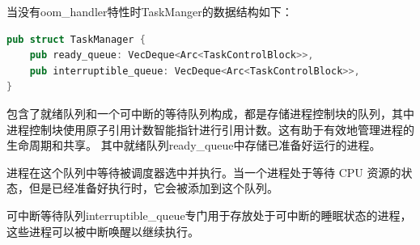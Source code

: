 当没有oom_handler特性时TaskManger的数据结构如下：
\begin{lstlisting}[language=rust,caption={数据结构TaskManager}]
    pub struct TaskManager {
    pub ready_queue: VecDeque<Arc<TaskControlBlock>>,
    pub interruptible_queue: VecDeque<Arc<TaskControlBlock>>,
}
\end{lstlisting}
包含了就绪队列和一个可中断的等待队列构成，都是存储进程控制块的队列，其中进程控制块使用原子引用计数智能指针进行引用计数。这有助于有效地管理进程的生命周期和共享。
其中就绪队列ready_queue中存储已准备好运行的进程。

进程在这个队列中等待被调度器选中并执行。当一个进程处于等待 CPU 资源的状态，但是已经准备好执行时，它会被添加到这个队列。

可中断等待队列interruptible_queue专门用于存放处于可中断的睡眠状态的进程，这些进程可以被中断唤醒以继续执行。

